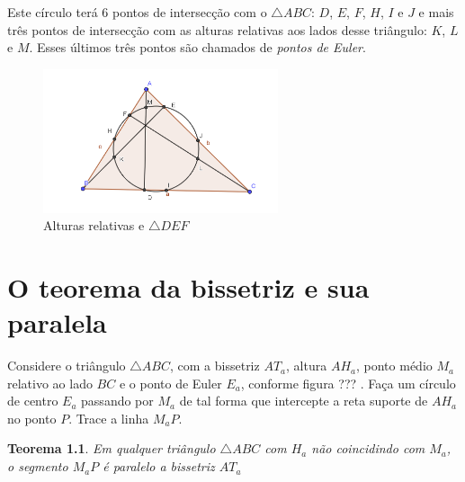 \documentclass[12pt, openright, a4paper, brazil, openany, oneside]{abntex2}
\newtheorem{teo}{Teorema}
\begin{document}
Este círculo terá 6 pontos de intersecção com o $\triangle ABC$: $D$, $E$, $F$, $H$, $I$ e $J$ e mais três pontos de intersecção com as alturas relativas aos lados desse triângulo: $K$, $L$ e $M$. Esses últimos três pontos são chamados de \textit{pontos de Euler}.

\begin{figure}[h]

    \center

    \includegraphics[width=6.9cm]{triangulo4.png}
    \caption{Alturas relativas e $\triangle DEF$ \label{tria4}}
    
\end{figure}

\chapter{O teorema da bissetriz e sua paralela}

Considere o triângulo $\triangle ABC$, com a bissetriz $AT_a$, altura $AH_a$, ponto médio $M_a$ relativo ao lado $BC$ e o ponto de Euler $E_a$, conforme figura ??? . Faça um círculo de centro $E_a$ passando por $M_a$ de tal forma que intercepte a reta suporte de $AH_a$ no ponto $P$. Trace a linha $M_{a}P$.

\begin{teo}\label{teo1}
	Em qualquer triângulo $\triangle ABC$ com $H_a$ não coincidindo com $M_a$, o segmento $M_{a}P$ é paralelo a bissetriz $AT_a$
\end{teo}
\end{document}
